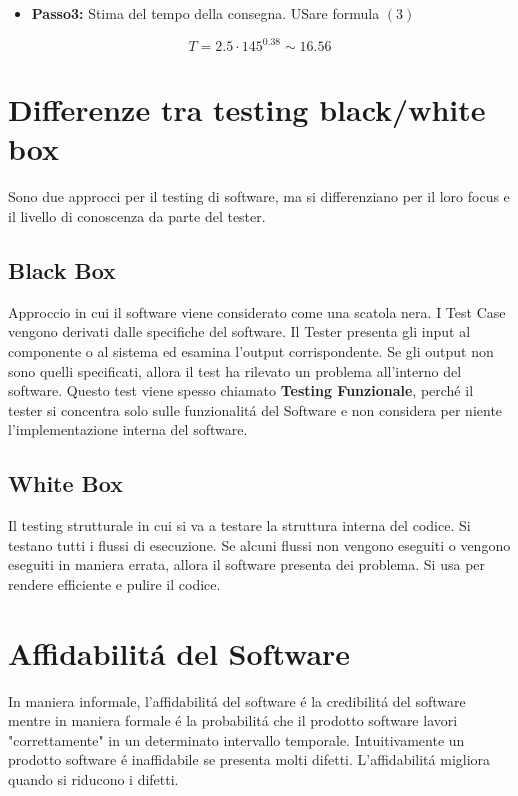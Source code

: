 \documentclass[11pt]{article}
\begin{document}
\begin{itemize}
\item \textbf{\textbf{Passo3:}} Stima del tempo della consegna. USare formula \((3)\)
\end{itemize}
$$T = 2.5 \cdot 145^{0.38} \sim 16.56$$
\section{Differenze tra testing black/white box}
\label{sec:orga9fb355}
Sono due approcci per il testing di software, ma si differenziano per il loro focus e il livello di conoscenza da parte del tester.
\subsection{Black Box}
\label{sec:orgba04ba2}
Approccio in cui il software viene considerato come una scatola nera.
I Test Case vengono derivati dalle specifiche del software.
Il Tester presenta gli input al componente o al sistema ed esamina l'output corrispondente.
Se gli output non sono quelli specificati, allora il test ha rilevato un problema all'interno del software.
Questo test viene spesso chiamato \textbf{\textbf{Testing Funzionale}}, perché il tester si concentra solo sulle funzionalitá del Software e non considera per niente l'implementazione interna del software.
\subsection{White Box}
\label{sec:org67759cf}
Il testing strutturale in cui si va a testare la struttura interna del codice. Si testano tutti i flussi di esecuzione. Se alcuni flussi non vengono eseguiti o vengono eseguiti in maniera errata, allora il software presenta dei problema.
Si usa per rendere efficiente e pulire il codice.
\section{Affidabilitá del Software}
\label{sec:orgde4fc25}
In maniera informale, l'affidabilitá del software é la credibilitá del software mentre in maniera formale é la probabilitá che il prodotto software lavori "correttamente" in un determinato intervallo temporale.
Intuitivamente un prodotto software é inaffidabile se presenta molti difetti.
L'affidabilitá migliora quando si riducono i difetti.
\end{document}

